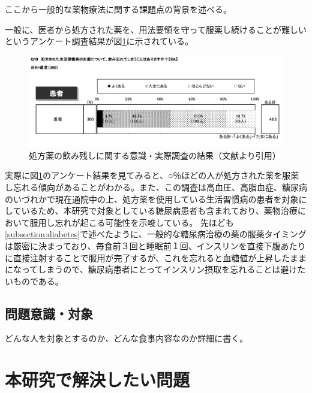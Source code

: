 ここから一般的な薬物療法に関する課題点の背景を述べる。

一般に、医者から処方された薬を、用法要領を守って服薬し続けることが難しいというアンケート調査結果が図\ref{fig:forget_medicine_number}に示されている。

\begin{figure}[htbp]
  \caption{処方薬の飲み残しに関する意識・実際調査の結果（文献\cite{drug_treatment_investivation}より引用）}
  \label{fig:forget_medicine_number}
  \begin{center}
    \includegraphics[bb=0 0 1000 400,width=15cm]{assets/forget_medicine_number.png}
  \end{center}
\end{figure}

実際に図\ref{fig:forget_medicine_number}のアンケート結果を見てみると、○％ほどの人が処方された薬を服薬し忘れる傾向があることがわかる。また、この調査は高血圧、高脂血症、糖尿病のいづれかで現在通院中の上、処方薬を使用している生活習慣病の患者を対象にしている\cite{drug_treatment_investigation}ため、本研究で対象としている糖尿病患者も含まれており、薬物治療において服用し忘れが起こる可能性を示唆している。
先ほども\ref{subsection:diabetes}で述べたように、一般的な糖尿病治療の薬の服薬タイミングは厳密に決まっており、毎食前３回と睡眠前１回、インスリンを直接下腹あたりに直接注射することで服用が完了するが、これを忘れると血糖値が上昇したままになってしまうので、糖尿病患者にとってインスリン摂取を忘れることは避けたいものである。

\subsection{問題意識・対象}

どんな人を対象とするのか、どんな食事内容なのか詳細に書く。

\section{本研究で解決したい問題}
\label{section:problem}

